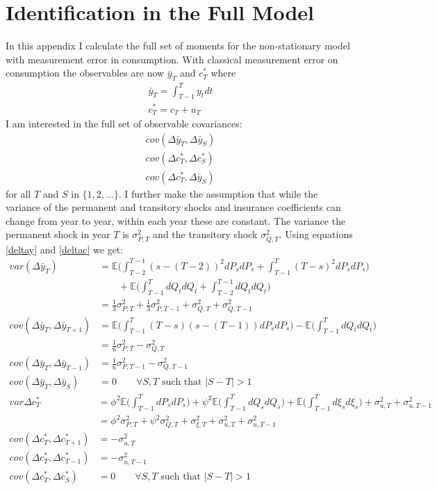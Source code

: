 \section{Identification in the Full Model} \label{identification}
In this appendix I calculate the full set of moments for the non-stationary model with measurement error in consumption. With classical measurement error on consumption the observables are now $\bar{y}_T$ and $c_T^*$ where
\begin{align*}
\bar{y}_T = \int_{T-1}^{T} y_t dt \\
c_T^* = c_T + u_T
\end{align*}
I am interested in the full set of observable covariances:
\begin{align*}
cov(\Delta \bar{y}_T, \Delta \bar{y}_S) \\
cov(\Delta c_T^*, \Delta c_S^*) \\
cov(\Delta c_T^*,  \Delta \bar{y}_S)
\end{align*}
for all $T$ and $S$ in $\{1,2,...\}$. I further make the assumption that while the variance of the permanent and transitory shocks and insurance coefficients can change from year to year, within each year these are constant. The variance the permanent shock in year $T$ is $\sigma^2_{P,T}$ and the transitory shock $\sigma^2_{Q,T}$. Using equations \ref{deltay} and \ref{deltac} we get:
\begin{align}
var(\Delta \bar{y}_T) &= \mathbb{E} \Big(\int_{T-2}^{T-1} (s-(T-2))^2 dP_s dP_s  + \int_{T-1}^{T} (T-s)^2 dP_s dP_s \Big) \nonumber \\
& \qquad + \mathbb{E} \Big(\int_{T-1}^{T} dQ_t dQ_t +\int_{T-2}^{T-1} dQ_t dQ_t \Big) \nonumber \\
&= \frac{1}{3} \sigma^2_{P,T} + \frac{1}{3} \sigma^2_{P,T-1} +  \sigma^2_{Q,T} +  \sigma^2_{Q,T-1} \label{inc_var_indentification}\\
cov(\Delta \bar{y}_T, \Delta \bar{y}_{T+1}) &=  \mathbb{E} \Big(\int_{T-1}^{T} (T-s)(s-(T-1)) dP_s dP_s  \Big) - \mathbb{E} \Big(\int_{T-1}^{T} dQ_t dQ_t \Big) \nonumber \\
&= \frac{1}{6}\sigma^2_{P,T} - \sigma^2_{Q,T} \\
cov(\Delta \bar{y}_T, \Delta \bar{y}_{T-1}) &= \frac{1}{6}\sigma^2_{P,T-1} - \sigma^2_{Q,T-1} \\
cov(\Delta \bar{y}_T, \Delta \bar{y}_{S}) &= 0 \qquad \forall S,T \text{ such that }|S-T| >1 
\end{align}
\begin{align}
var{\Delta c_T^*} &= \phi^2 \mathbb{E}\Big( \int_{T-1}^{T} dP_s dP_s \Big) + \psi^2 \mathbb{E}\Big( \int_{T-1}^{T} dQ_s dQ_s \Big) + \mathbb{E} \Big( \int_{T-1}^{T} d\xi_s d\xi_s \Big) +  \sigma^2_{u,T} +  \sigma^2_{u,T-1} \nonumber \\
&= \phi^2 \sigma^2_{P,T} + \psi^2 \sigma^2_{Q,T} + \sigma^2_{\xi,T}+\sigma^2_{u,T}+   \sigma^2_{u,T-1}  \\
cov(\Delta c_T^*, \Delta c_{T+1}^*) &= -\sigma^2_{u,T} \\
cov(\Delta c_T^*, \Delta c_{T-1}^*) &= -\sigma^2_{u,T-1} \\
cov(\Delta c_T^*, \Delta c_S^*) &= 0 \qquad \forall S,T \text{ such that }|S-T| >1 
\end{align}
